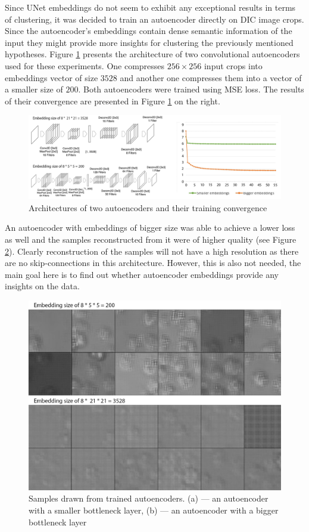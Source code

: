 Since UNet embeddings do not seem to exhibit any exceptional results in terms of clustering, it was decided to train an autoencoder directly on DIC image crops. Since the autoencoder's embeddings contain dense semantic information of the input they might provide more insights for clustering the previously mentioned hypotheses. Figure \ref{fig:ae-training} presents the architecture of two convolutional autoencoders used for these experiments. One compresses $256 \times 256$ input crops into embeddings vector of size $3528$ and another one compresses them into a vector of a smaller size of $200$. Both autoencoders were trained using MSE loss. The results of their convergence are presented in Figure \ref{fig:ae-training} on the right.

\begin{figure}[H]
	\begin{center}
		\includegraphics[width=\linewidth]{bilder/ae-embeddings/training-architectures.png}
		\caption{Architectures of two autoencoders and their training convergence}\label{fig:ae-training}
	\end{center}
\end{figure}

An autoencoder with embeddings of bigger size was able to achieve a lower loss as well and the samples reconstructed from it were of higher quality (see Figure \ref{fig:ae-samples}). Clearly reconstruction of the samples will not have a high resolution as there are no skip-connections in this architecture. However, this is also not needed, the main goal here is to find out whether autoencoder embeddings provide any insights on the data.
\begin{figure}[htb]
	\begin{center}
		\includegraphics[width=0.5\linewidth]{bilder/ae-embeddings/ae-samples.png}
		\caption{Samples drawn from trained autoencoders. (a) --- an autoencoder with a smaller bottleneck layer, (b) --- an autoencoder with a bigger bottleneck layer}
		\label{fig:ae-samples}
	\end{center}
\end{figure}

